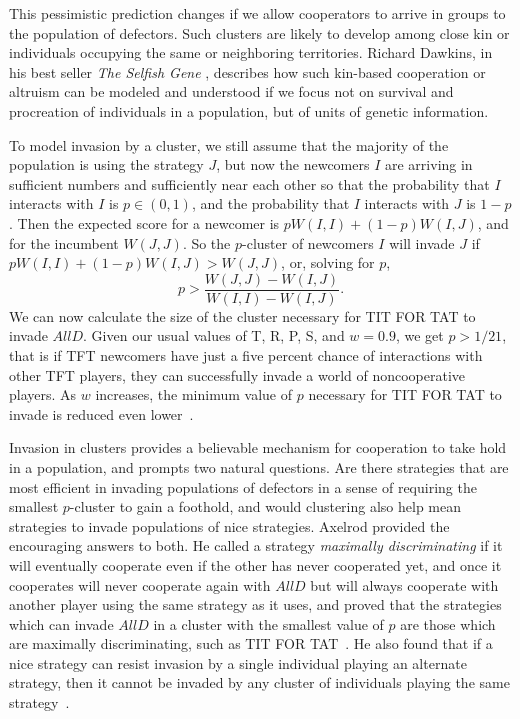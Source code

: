This pessimistic prediction changes if we allow cooperators to arrive in groups to the population of defectors. Such clusters are likely to develop among close kin or individuals occupying the same or neighboring territories. Richard Dawkins, in his best seller \textit{The Selfish Gene} \cite{dawkins2006selfish}, describes how such kin-based cooperation or altruism can be modeled and understood if we focus not on survival and procreation of individuals in a population, but of units of genetic information.

To model invasion by a cluster, we still assume that the majority of the population is using the strategy $J$, but now the newcomers $I$ are arriving in sufficient numbers and sufficiently near each other so that the probability that $I$ interacts with $I$ is $p \in (0, 1)$, and the probability that $I$ interacts with $J$ is $1-p$. Then the expected score for a newcomer is $pW(I, I) + (1-p) W(I, J)$, and for the incumbent $W(J, J)$. So the $p$-cluster of newcomers $I$ will invade $J$ if $pW(I, I) + (1-p) W(I, J) > W(J, J)$, or, solving for $p$,
\[
p > \frac{W(J, J) - W(I, J)}{W(I, I) - W(I, J)}.
\]
We can now calculate the size of the cluster necessary for TIT FOR TAT to invade $AllD$. Given our usual values of T, R, P, S, and $w = 0.9$, we get $p > 1/21$, that is if TFT newcomers have just a five percent chance of interactions with other TFT players, they can successfully invade a world of noncooperative players. As $w$ increases, the minimum value of $p$ necessary for TIT FOR TAT to invade is reduced even lower~\cite{RobertAxelrod_1981}.

Invasion in clusters provides a believable mechanism for cooperation to take hold in a population, and prompts two natural questions. Are there strategies that are most efficient in invading populations of defectors in a sense of requiring the smallest $p$-cluster to gain a foothold, and would clustering also help mean strategies to invade populations of nice strategies. Axelrod provided the encouraging answers to both. He called a strategy \textit{maximally discriminating} if it will eventually cooperate even if the other has never cooperated yet, and once it cooperates will never cooperate again with $AllD$ but will always cooperate with another player using the same strategy as it uses, and proved that the strategies which can invade $AllD$ in a cluster with the smallest value of $p$ are those which are maximally discriminating, such as TIT FOR TAT~\cite[Theorem 7]{RobertAxelrod_1981}. He also found that if a nice strategy can resist invasion by a single individual playing an alternate strategy, then it cannot be invaded by any cluster of individuals playing the same strategy~\cite[Theorem 8]{RobertAxelrod_1981}.


